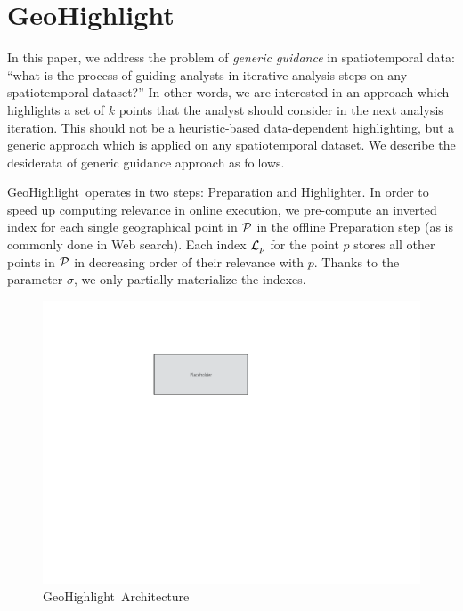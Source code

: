 \documentclass[conference]{IEEEtran}
\newcommand{\sys}{{\sc GeoHighlight}}
\newcommand{\framework}{{\sc GeoHighlight}}
\begin{document}
\vspace{-5pt}

\section{\sys}
In this paper, we address the problem of {\em generic guidance} in spatiotemporal data: ``what is the process of guiding analysts in iterative analysis steps on any spatiotemporal dataset?'' In other words, we are interested in an approach which highlights a set of $k$ points that the analyst should consider in the next analysis iteration. This should not be a heuristic-based data-dependent highlighting, but a generic approach which is applied on any spatiotemporal dataset. We describe the desiderata of generic guidance approach as follows.

\framework\ operates in two steps: {\sc Preparation} and {\sc Highlighter}. In order to speed up computing relevance in online execution, we pre-compute an inverted index for each single geographical point in ${\cal P}$ in the offline {\sc Preparation} step (as is commonly done in Web search). Each index ${\cal L}_p$ for the point $p$ stores all other points in ${\cal P}$ in decreasing order of their relevance with $p$. Thanks to the parameter $\sigma$, we only partially materialize the indexes.


 \begin{figure}[t]
   \centering
   \includegraphics[width=\columnwidth]{figs/placeholder}
 \caption{\framework\ Architecture}
 \label{fig:architecture}
 \vspace{-10pt}
 \end{figure}
\end{document}
